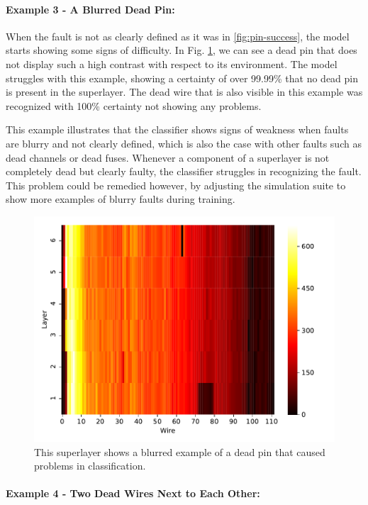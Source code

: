 \paragraph{Example 3 - A Blurred Dead Pin:}

When the fault is not as clearly defined as it was in
\ref{fig:pin-success}, the model starts showing some signs of
difficulty. In Fig. \ref{fig:pin-failure}, we can see a dead pin that
does not display such a high contrast with respect to its environment.
The model struggles with this example, showing a certainty of over
99.99\% that no dead pin is present in the superlayer. The dead wire
that is also visible in this example was recognized with 100\%
certainty not showing any problems.

This example illustrates that the classifier shows signs of weakness
when faults are blurry and not clearly defined, which is
also the case with other faults such as dead channels or dead
fuses. Whenever a component of a superlayer is not completely dead but
clearly faulty, the classifier struggles in recognizing the
fault. This problem could be remedied however, by adjusting the
simulation suite to show more examples of blurry faults during
training.

\begin{figure}
  \includegraphics[width=\textwidth]{../figures/small_pin_fail}
  \caption{This superlayer shows a blurred example of a dead pin that
    caused problems in classification.}
  \label{fig:pin-failure}
\end{figure}

\paragraph{Example 4 - Two Dead Wires Next to Each Other:}

